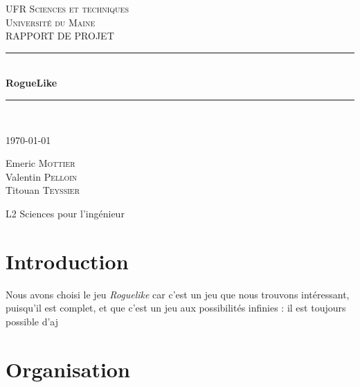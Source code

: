 \documentclass[12pt]{report}
\begin{document}
\begin{titlepage}
	
	\newcommand{\HRule}{\rule{\linewidth}{0.5mm}}
	\center
	
	\vspace*{30pt}
	
	\textsc{\Large UFR Sciences et techniques\\ Université du Maine}\\[1.5cm]
	
	\Large RAPPORT DE PROJET\\[1.5cm]
	

	\vspace*{\fill}
	
	\HRule \\[0.4cm]
	{ \huge \bfseries RogueLike}\\
	\HRule \\[1.5cm]
	 
	 
	 \vspace{12pt}
	 
	{\large \today}\\[1cm]
	
	\vspace{12pt}
	
	\Large 
	
		Emeric \textsc{Mottier}\\
		Valentin \textsc{Pelloin}\\
		Titouan \textsc{Teyssier}\\
	
		\vspace{12pt}
		
		L2 Sciences pour l'ingénieur
		
	\vspace*{\fill}
	
\end{titlepage}

\tableofcontents

\chapter{Introduction}

Nous avons choisi le jeu \emph{Roguelike} car c'est un jeu que nous trouvons intéressant, puisqu'il est complet, et que c'est un jeu aux possibilités infinies :  il est toujours possible d'aj

\chapter{Organisation}
\end{document}
